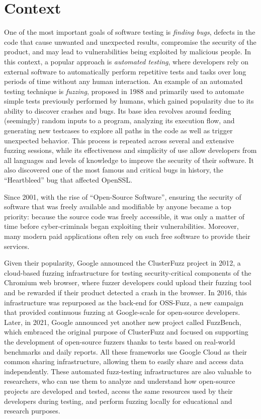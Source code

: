 \section{Context}
One of the most important goals of software testing is \textit{finding bugs}, defects in the code that cause unwanted and unexpected results, compromise the security of the product, and may lead to vulnerabilities being exploited by malicious people. In this context, a popular approach is \textit{automated testing}, where developers rely on external software to automatically perform repetitive tests and tasks over long periods of time without any human interaction. An example of an automated testing technique is \textit{fuzzing}, proposed in 1988 \cite{fuzz_proposed} and primarily used to automate simple tests previously performed by humans, which gained popularity due to its ability to discover crashes and bugs. Its base idea revolves around feeding (seemingly) random inputs to a program, analyzing its execution flow, and generating new testcases to explore all paths in the code as well as trigger unexpected behavior. This process is repeated across several and extensive fuzzing sessions, while its effectiveness and simplicity of use allow developers from all languages and levels of knowledge to improve the security of their software. It also discovered one of the most famous and critical bugs in history, the ``Heartbleed'' bug that affected OpenSSL.

Since 2001, with the rise of ``Open-Source Software'', ensuring the security of software that was freely available and modifiable by anyone became a top priority: because the source code was freely accessible, it was only a matter of time before cyber-criminals began exploiting their vulnerabilities. Moreover, many modern paid applications often rely on such free software to provide their services. 

Given their popularity, Google announced the ClusterFuzz project in 2012, a cloud-based fuzzing infrastructure for testing security-critical components of the Chromium web browser, where fuzzer developers could upload their fuzzing tool and be rewarded if their product detected a crash in the browser. In 2016, this infrastructure was repurposed as the back-end for OSS-Fuzz, a new campaign that provided continuous fuzzing at Google-scale for open-source developers. Later, in 2021, Google announced yet another new project called FuzzBench, which embraced the original purpose of ClusterFuzz and focused on supporting the development of open-source fuzzers thanks to tests based on real-world benchmarks and daily reports. All these frameworks use Google Cloud as their common sharing infrastructure, allowing them to easily share and access data independently. These automated fuzz-testing infrastructures are also valuable to researchers, who can use them to analyze and understand how open-source projects are developed and tested, access the same resources used by their developers during testing, and perform fuzzing locally for educational and research purposes.

